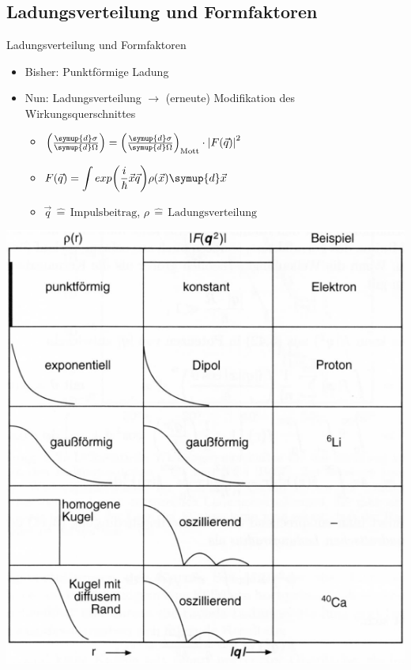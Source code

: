 \documentclass[aspectratio=1610, 9pt]{beamer}
\begin{document}
\subsection{Ladungsverteilung und Formfaktoren}
\begin{frame}{Ladungsverteilung und Formfaktoren}
\begin{itemize}
  \item{Bisher: Punktförmige Ladung}
  \item{Nun: Ladungsverteilung $\rightarrow$  (erneute) Modifikation des Wirkungsquerschnittes}
  \begin{itemize}
    \item{$\left( \frac{\symup{d} \sigma}{\symup{d} \Omega } \right) = \left( \frac{\symup{d} \sigma}{\symup{d} \Omega } \right)_\text{Mott} \cdot \left| F(\vec{q}) \right|^2 $}
    \item{$F(\vec{q}) = \displaystyle \int{ exp{\left(\frac{i}{\hbar} \vec{x} \vec{q} \right)} \rho(\vec{x}) \symup{d}\vec{x} } $}
    \item{$\vec{q} \,\hat{=} \,\text{Impulsbeitrag} $, $\rho \,\hat{=} \,\text{Ladungsverteilung} $}
  \end{itemize}
\end{itemize}

\end{frame}


\begin{frame}
\centering
  \includegraphics[scale=0.35]{images/Form.png}
\end{frame}
\end{document}

